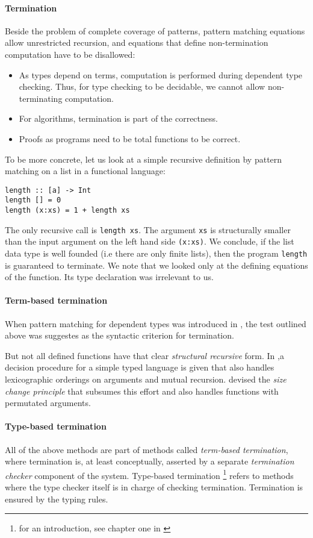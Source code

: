 \paragraph*{Termination}
Beside the problem of complete coverage of patterns, pattern matching equations allow unrestricted recursion, and equations that define non-termination computation have to be disallowed: 
\begin{itemize}
\item
As types depend on terms, computation is performed during dependent type checking.
Thus, for type checking to be decidable, we cannot allow non-terminating computation. 
\item
For algorithms, termination is part of the correctness.
\item
Proofs as programs need to be total functions to be correct.
\end{itemize}
To be more concrete, let us look at a simple recursive definition by pattern matching on a list in a functional language: 
\begin{verbatim}
length :: [a] -> Int
length [] = 0
length (x:xs) = 1 + length xs 
\end{verbatim}
The only recursive call is \texttt{length xs}.
The argument \texttt{xs} is structurally smaller than the input argument on the left hand side \texttt{(x:xs)}.
We conclude, if the list data type is well founded (i.e there are only finite lists), then the program \texttt{length} is guaranteed to terminate.
We note that we looked only at the defining equations of the function. Its type declaration was irrelevant to us.
\paragraph*{Term-based termination}
When pattern matching for dependent types was introduced in  \cite{coquand-pattern},
the test outlined above was suggestes as the syntactic criterion for termination. 

But not all defined functions have that clear \emph{structural recursive} form.
In \cite{abel-altenkrich},a decision procedure for a simple typed language is given that also handles lexicographic orderings on arguments and mutual recursion.
\cite{jones} devised the \emph{size change principle} that subsumes this effort and also handles functions with permutated arguments. 
\paragraph*{Type-based termination}
All of the above methods are part of methods called \emph{term-based termination}, where termination is, at least conceptually,  asserted by a separate \emph{termination checker} component of the system. 
Type-based termination \footnote{for an introduction, see chapter one in \cite{abel-phd}} refers to methods where the type checker itself is in charge of checking termination. Termination is ensured by the typing rules. 

